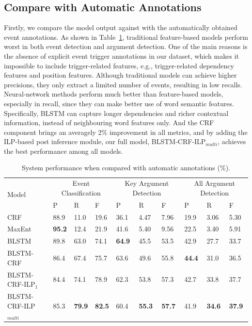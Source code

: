 \subsection{Compare with Automatic Annotations}
Firstly, we compare the model output against with the automatically obtained event annotations. 
As shown in Table~\ref{tab:1}, traditional feature-based models perform worst in both event detection and argument detection. 
One of the main reasons is the absence of explicit event trigger annotations in our dataset, which makes it impossible to include trigger-related features, e.g., trigger-related dependency features and position features. 
Although traditional models can achieve higher precisions, they only extract a limited number of events, resulting in low recalls. 
Neural-network methods perform much better than feature-based models, especially in recall, since they can make better use of word semantic features. Specifically, BLSTM can capture longer dependencies and richer contextual information, instead of neighbouring word features only.
And the CRF component brings an averagely 2\% improvement in all metrics, and by adding the ILP-based post inference module, our full model, BLSTM-CRF-ILP$_{multi}$, achieves the best performance among all models. 

\begin{table}[!t]
\centering
\small
\begin{tabular}{|l|p{}<{\centering}|p{}<{\centering}|p{}<{\centering}|p{}<{\centering}|p{}<{\centering}|p{}<{\centering}|p{}<{\centering}|p{}<{\centering}|p{}<{\centering}|} \hline
	\multirow{2}{*}{Model} & \multicolumn{3}{c|}{Event Classification} & \multicolumn{3}{c|}{Key Argument Detection} &
	\multicolumn{3}{c|}{All Argument Detection} \\ \cline{2-10}
	 & P & R & F & P & R & F & P & R & F \\ \hline
	CRF & 88.9 & 11.0 & 19.6 & 36.1 & 4.47 & 7.96 & 19.9 & 3.06 & 5.30  \\ \hline
	MaxEnt & \textbf{95.2} & 12.4 & 21.9 & 41.6 & 5.40 & 9.56 & 22.5 & 3.40 & 5.91 \\ \hline
	BLSTM & 89.8 & 63.0 & 74.1 & \textbf{64.9} & 45.5 & 53.5 & 42.9 & 27.7 & 33.7  \\ \hline \hline
	BLSTM-CRF & 86.4 & 67.4 & 75.7 & 63.6 & 49.6 & 55.8 & \textbf{44.4} & 31.0 & 36.5  \\ \hline
	BLSTM-CRF-ILP$_{1}$ & 84.4 & 74.1 & 78.9 & 62.3 & 53.8 & 57.3 & 42.7 & 33.8 & 37.7 \\ \hline
	BLSTM-CRF-ILP$_{multi}$ & 85.3 & \textbf{79.9} & \textbf{82.5} & 60.4 & \textbf{55.3} & \textbf{57.7} & 41.9 & \textbf{34.6} & \textbf{37.9} \\ \hline
\end{tabular}
\caption{System performance when compared with automatic annotations (\%).  \label{tab:1}}
\end{table}

